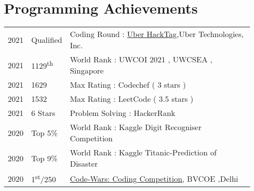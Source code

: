 \documentclass[]{deedy-resume-openfont}
\begin{document}
\begin{minipage}[t]{0.66\textwidth}









\section{Programming Achievements} 

\begin{tabular}{rll}
2021    &  Qualified   & Coding Round : \href{http://nikhil-bhasin.netlify.app/data/Uber_HackTag.pdf}{Uber HackTag},Uber Technologies, Inc.   \\
2021    &  1129\textsuperscript{th} & World Rank : UWCOI 2021 , UWCSEA , Singapore \\
2021    &  1629 & Max Rating : Codechef ( 3 stars )   \\
2021    & 1532 & Max Rating  : LeetCode ( 3.5 stars ) \\
2021    &  6 Stars & Problem Solving : HackerRank   \\
2020     & Top 5\% & World Rank : Kaggle Digit Recogniser Competition\\
2020     & Top 9\% & World Rank : Kaggle Titanic-Prediction of Disaster\\
2020	 & 1\textsuperscript{st}/250  & \href{https://nikhil-bhasin.netlify.app/data/Bvcoe_Codewars.pdf}{Code-Wars: Coding Competition}, BVCOE ,Delhi\\
\end{tabular}





\end{minipage} 
\end{document}

